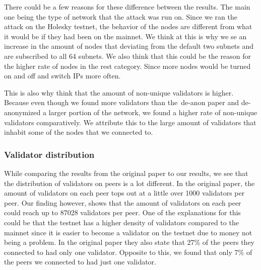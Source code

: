 There could be a few reasons for these difference between the results.
The main one being the type of network that the attack was run on.
Since we ran the attack on the Holesky testnet, the behavior of the nodes are different from what it would be if they had been on the mainnet.
We think at this is why we se an increase in the amount of nodes that deviating from the default two subnets and are subscribed to all 64 subnets.
We also think that this could be the reason for the higher rate of nodes in the rest category.
Since more nodes would be turned on and off and switch IPs more often.


This is also why think that the amount of non-unique validators is higher.
Because even though we found more validators than the~\gls{de-anon paper} and de-anonymized a larger portion of the network, we found a higher rate of non-unique validators comparatively.
We attribute this to the large amount of validators that inhabit some of the nodes that we connected to.



\subsubsection{Validator distribution}\label{subsubsec:validator-distribution}
While comparing the results from the original paper to our results, we see that the distribution of validators on peers is a lot different.
In the original paper, the amount of validators on each peer tops out at a little over 1000 validators per peer.
Our finding however, shows that the amount of validators on each peer could reach up to 87028 validators per peer.
One of the explanations for this could be that the testnet has a higher density of validators compared to the mainnet since it is easier to become a validator on the testnet due to money not being a problem.
In the original paper they also state that 27\% of the peers they connected to had only one validator.
Opposite to this, we found that only 7\% of the peers we connected to had just one validator.
